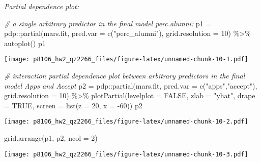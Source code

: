 \documentclass[
]{article}
\newenvironment{Shaded}{\begin{snugshade}}{\end{snugshade}}
\newcommand{\AttributeTok}[1]{\textcolor[rgb]{0.77,0.63,0.00}{#1}}
\newcommand{\CommentTok}[1]{\textcolor[rgb]{0.56,0.35,0.01}{\textit{#1}}}
\newcommand{\ConstantTok}[1]{\textcolor[rgb]{0.00,0.00,0.00}{#1}}
\newcommand{\DecValTok}[1]{\textcolor[rgb]{0.00,0.00,0.81}{#1}}
\newcommand{\FunctionTok}[1]{\textcolor[rgb]{0.00,0.00,0.00}{#1}}
\newcommand{\NormalTok}[1]{#1}
\newcommand{\OtherTok}[1]{\textcolor[rgb]{0.56,0.35,0.01}{#1}}
\newcommand{\SpecialCharTok}[1]{\textcolor[rgb]{0.00,0.00,0.00}{#1}}
\newcommand{\StringTok}[1]{\textcolor[rgb]{0.31,0.60,0.02}{#1}}
\begin{document}
\emph{Partial dependence plot:}

\begin{Shaded}
\begin{Highlighting}[]
\CommentTok{\# a single arbitrary predictor in the final model \textasciigrave{}perc.alumni\textasciigrave{}:}
\NormalTok{p1 }\OtherTok{=}\NormalTok{ pdp}\SpecialCharTok{::}\FunctionTok{partial}\NormalTok{(mars.fit, }\AttributeTok{pred.var =} \FunctionTok{c}\NormalTok{(}\StringTok{"perc\_alumni"}\NormalTok{), }\AttributeTok{grid.resolution =} \DecValTok{10}\NormalTok{) }\SpecialCharTok{\%\textgreater{}\%} \FunctionTok{autoplot}\NormalTok{()}
\NormalTok{p1}
\end{Highlighting}
\end{Shaded}

\texttt{[image: p8106\_hw2\_qz2266\_files/figure-latex/unnamed-chunk-10-1.pdf]}

\begin{Shaded}
\begin{Highlighting}[]
\CommentTok{\# interaction partial dependence plot between arbitrary predictors in the final model \textasciigrave{}Apps\textasciigrave{} and \textasciigrave{}Accept\textasciigrave{}}
\NormalTok{p2 }\OtherTok{=}\NormalTok{ pdp}\SpecialCharTok{::}\FunctionTok{partial}\NormalTok{(mars.fit, }\AttributeTok{pred.var =} \FunctionTok{c}\NormalTok{(}\StringTok{"apps"}\NormalTok{,}\StringTok{"accept"}\NormalTok{), }\AttributeTok{grid.resolution =} \DecValTok{10}\NormalTok{) }\SpecialCharTok{\%\textgreater{}\%} \FunctionTok{plotPartial}\NormalTok{(}\AttributeTok{levelplot =} \ConstantTok{FALSE}\NormalTok{, }\AttributeTok{zlab =} \StringTok{"yhat"}\NormalTok{, }\AttributeTok{drape =} \ConstantTok{TRUE}\NormalTok{, }\AttributeTok{screen =} \FunctionTok{list}\NormalTok{(}\AttributeTok{z =} \DecValTok{20}\NormalTok{, }\AttributeTok{x =} \SpecialCharTok{{-}}\DecValTok{60}\NormalTok{))}
\NormalTok{p2}
\end{Highlighting}
\end{Shaded}

\texttt{[image: p8106\_hw2\_qz2266\_files/figure-latex/unnamed-chunk-10-2.pdf]}

\begin{Shaded}
\begin{Highlighting}[]
\FunctionTok{grid.arrange}\NormalTok{(p1, p2, }\AttributeTok{ncol =} \DecValTok{2}\NormalTok{)}
\end{Highlighting}
\end{Shaded}

\texttt{[image: p8106\_hw2\_qz2266\_files/figure-latex/unnamed-chunk-10-3.pdf]}
\end{document}
